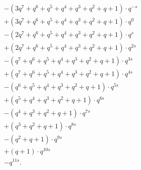 \begin{example}
\begin{align*}
    &- (3q^7+q^6+q^5+q^4+q^3+q^2+q+1) \cdot q^{-s} \\
    &+ (3q^7+q^6+q^5+q^4+q^3+q^2+q+1) \cdot q^{0} \\
    &- (2q^7+q^6+q^5+q^4+q^3+q^2+q+1) \cdot q^{s} \\
    &+ (2q^7+q^6+q^5+q^4+q^3+q^2+q+1) \cdot q^{2s} \\
    &- (q^7+q^6+q^5+q^4+q^3+q^2+q+1) \cdot q^{3s} \\
    &+ (q^7+q^6+q^5+q^4+q^3+q^2+q+1) \cdot q^{4s} \\
    &- (q^6+q^5+q^4+q^3+q^2+q+1) \cdot q^{5s} \\
    &+ (q^5+q^4+q^3+q^2+q+1) \cdot q^{6s} \\
    &- (q^4+q^3+q^2+q+1) \cdot q^{7s} \\
    &+ (q^3+q^2+q+1) \cdot q^{8s} \\
    &- (q^2+q+1) \cdot q^{9s} \\
    &+ (q+1) \cdot q^{10s} \\
    &- q^{11s}.
  \end{align*}
\end{example}
